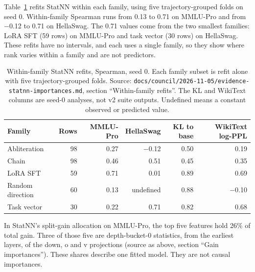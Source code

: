 Table~\ref{tab:within} refits StatNN within each family, using five trajectory-grouped folds on seed 0. Within-family Spearman runs from 0.13 to 0.71 on MMLU-Pro and from $-$0.12 to 0.71 on HellaSwag. The 0.71 values come from the two smallest families: LoRA SFT (59 rows) on MMLU-Pro and task vector (30 rows) on HellaSwag. These refits have no intervals, and each uses a single family, so they show where rank varies within a family and are not predictors.
\begin{table}[t]
\centering
\footnotesize
\begin{tabular}{lrrrrr}\toprule
Family & Rows & MMLU-Pro & HellaSwag & KL to base & WikiText log-PPL \\\midrule
Abliteration & 98 & 0.27 & $-$0.12 & 0.50 & 0.19 \\
Chain & 98 & 0.46 & 0.51 & 0.45 & 0.35 \\
LoRA SFT & 59 & 0.71 & 0.01 & 0.89 & 0.69 \\
Random direction & 60 & 0.13 & undefined & 0.88 & $-$0.10 \\
Task vector & 30 & 0.22 & 0.71 & 0.82 & 0.68 \\\bottomrule
\end{tabular}
\caption{Within-family StatNN refits, Spearman, seed 0. Each family subset is refit alone with five trajectory-grouped folds. Source: \texttt{docs/council/2026-11-05/evidence-statnn-importances.md}, section ``Within-family refits''. The KL and WikiText columns are seed-0 analyses, not v2 suite outputs. Undefined means a constant observed or predicted value.}
\label{tab:within}
\end{table}

In StatNN's split-gain allocation on MMLU-Pro, the top five features hold 26\% of total gain. Three of those five are depth-bucket-0 statistics, from the earliest layers, of the down, o and v projections (source as above, section ``Gain importances''). These shares describe one fitted model. They are not causal importances.

